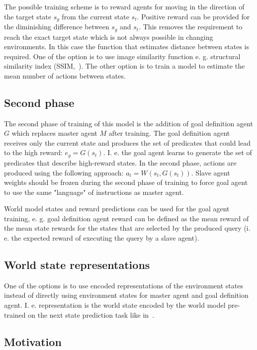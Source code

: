 \documentclass{article}
\begin{document}
The possible training scheme is to reward agents for moving in the direction of the target state $s_g$ from the current state $s_t$. Positive reward can be provided for the diminishing difference between $s_g$ and $s_t$. This removes the requirement to reach the exact target state which is not always possible in changing environments. In this case the function that estimates distance between states is required. One of the option is to use image similarity function e. g. structural similarity index (SSIM,~\citep{Wang2004ImageQA}). The other option is to train a model to estimate the mean number of actions between states.

\subsection{Second phase}

The second phase of training of this model is the addition of goal definition agent $G$ which replaces master agent $M$ after training. The goal definition agent receives only the current state and produces the set of predicates that could lead to the high reward: $e_g = G(s_t)$. I. e. the goal agent learns to generate the set of predicates that describe high-reward states. In the second phase, actions are produced using the following approach: $a_t = W(s_t, G(s_t))$. Slave agent weights should be frozen during the second phase of training to force goal agent to use the same "language" of instructions as master agent.

World model states and reward predictions can be used for the goal agent training, e. g. goal definition agent reward can be defined as the mean reward of the mean state rewards for the states that are selected by the produced query (i. e. the expected reward of executing the query by a slave agent).


\subsection{World state representations}

One of the options is to use encoded representations of the environment states instead of directly using environment states for master agent and goal definition agent. I. e. representation is the world state encoded by the world model pre-trained on the next state prediction task like in~\citep{Ha2018RecurrentWM}.

\subsection{Motivation}
\end{document}
